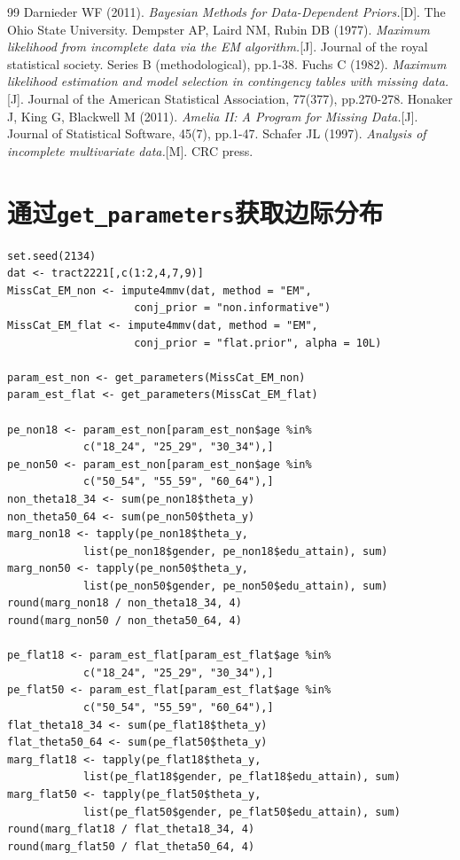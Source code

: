 \documentclass[12pt,hyperref,a4paper,UTF8]{ctexart}
\begin{document}
  
  \newpage
  \begin{thebibliography}{99}
      Darnieder WF (2011). \emph{Bayesian Methods for Data-Dependent Priors.}[D]. The Ohio State University.
      Dempster AP, Laird NM, Rubin DB (1977). \emph{Maximum likelihood from incomplete data via the EM algorithm.}[J]. Journal of the royal statistical society. Series B (methodological), pp.1-38.
    Fuchs C (1982). \emph{Maximum likelihood estimation and model selection in contingency tables with missing data.}[J]. Journal of the American Statistical Association, 77(377), pp.270-278.
    Honaker J, King G, Blackwell M (2011). \emph{Amelia II: A Program for Missing Data.}[J]. Journal of Statistical Software, 45(7), pp.1-47.
    Schafer JL (1997). \emph{Analysis of incomplete multivariate data.}[M]. CRC press.
  \end{thebibliography}
  
\newpage


\appendix
\section{通过\texttt{get\_parameters}获取边际分布}

\begin{lstlisting}[style=R]
set.seed(2134)
dat <- tract2221[,c(1:2,4,7,9)]
MissCat_EM_non <- impute4mmv(dat, method = "EM", 
                    conj_prior = "non.informative")
MissCat_EM_flat <- impute4mmv(dat, method = "EM", 
                    conj_prior = "flat.prior", alpha = 10L)

param_est_non <- get_parameters(MissCat_EM_non)
param_est_flat <- get_parameters(MissCat_EM_flat)

pe_non18 <- param_est_non[param_est_non$age %in%
            c("18_24", "25_29", "30_34"),]
pe_non50 <- param_est_non[param_est_non$age %in%
            c("50_54", "55_59", "60_64"),]
non_theta18_34 <- sum(pe_non18$theta_y)
non_theta50_64 <- sum(pe_non50$theta_y)
marg_non18 <- tapply(pe_non18$theta_y,
            list(pe_non18$gender, pe_non18$edu_attain), sum)
marg_non50 <- tapply(pe_non50$theta_y,
            list(pe_non50$gender, pe_non50$edu_attain), sum)
round(marg_non18 / non_theta18_34, 4)
round(marg_non50 / non_theta50_64, 4)

pe_flat18 <- param_est_flat[param_est_flat$age %in%
            c("18_24", "25_29", "30_34"),]
pe_flat50 <- param_est_flat[param_est_flat$age %in%
            c("50_54", "55_59", "60_64"),]
flat_theta18_34 <- sum(pe_flat18$theta_y)
flat_theta50_64 <- sum(pe_flat50$theta_y)
marg_flat18 <- tapply(pe_flat18$theta_y,
            list(pe_flat18$gender, pe_flat18$edu_attain), sum)
marg_flat50 <- tapply(pe_flat50$theta_y,
            list(pe_flat50$gender, pe_flat50$edu_attain), sum)
round(marg_flat18 / flat_theta18_34, 4)
round(marg_flat50 / flat_theta50_64, 4)
\end{lstlisting}
\end{document}
